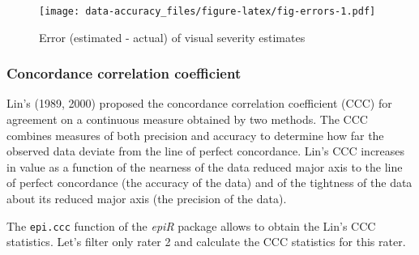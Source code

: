 \documentclass[
  letterpaper,
]{book}
\begin{document}
\begin{figure}

{\centering \texttt{[image: data-accuracy\_files/figure-latex/fig-errors-1.pdf]}

}

\caption{\label{fig-errors}Error (estimated - actual) of visual severity
estimates}

\end{figure}

\hypertarget{concordance-correlation-coefficient}{%
\subsubsection{Concordance correlation
coefficient}\label{concordance-correlation-coefficient}}

Lin's (1989, 2000) proposed the concordance correlation coefficient
(CCC) for agreement on a continuous measure obtained by two methods. The
CCC combines measures of both precision and accuracy to determine how
far the observed data deviate from the line of perfect concordance.
Lin's CCC increases in value as a function of the nearness of the data
reduced major axis to the line of perfect concordance (the accuracy of
the data) and of the tightness of the data about its reduced major axis
(the precision of the data).

The \texttt{epi.ccc} function of the \emph{epiR} package allows to
obtain the Lin's CCC statistics. Let's filter only rater 2 and calculate
the CCC statistics for this rater.
\end{document}
